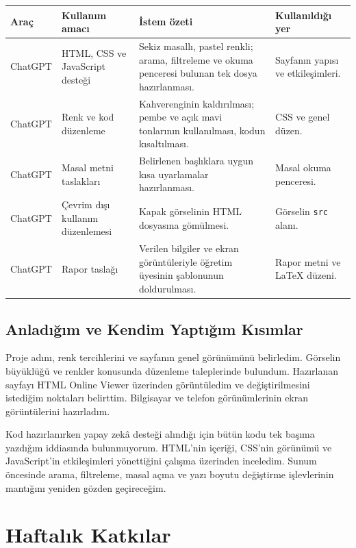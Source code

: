 \documentclass[12pt,a4paper]{article}
\begin{document}
\begin{longtable}{@{}p{1.7cm}p{3.2cm}p{4.6cm}p{3.5cm}@{}}
\toprule
\textbf{Araç} & \textbf{Kullanım amacı}
& \textbf{İstem özeti} & \textbf{Kullanıldığı yer}\\
\midrule
\endhead

ChatGPT
& HTML, CSS ve JavaScript desteği
& Sekiz masallı, pastel renkli; arama, filtreleme
ve okuma penceresi bulunan tek dosya hazırlanması.
& Sayfanın yapısı ve etkileşimleri.\\

ChatGPT
& Renk ve kod düzenleme
& Kahverenginin kaldırılması; pembe ve açık mavi
tonlarının kullanılması, kodun kısaltılması.
& CSS ve genel düzen.\\

ChatGPT
& Masal metni taslakları
& Belirlenen başlıklara uygun kısa uyarlamalar
hazırlanması.
& Masal okuma penceresi.\\

ChatGPT
& Çevrim dışı kullanım düzenlemesi
& Kapak görselinin HTML dosyasına gömülmesi.
& Görselin \texttt{src} alanı.\\

ChatGPT
& Rapor taslağı
& Verilen bilgiler ve ekran görüntüleriyle
öğretim üyesinin şablonunun doldurulması.
& Rapor metni ve LaTeX düzeni.\\

\bottomrule
\end{longtable}

\subsection{Anladığım ve Kendim Yaptığım Kısımlar}

Proje adını, renk tercihlerini ve sayfanın genel
görünümünü belirledim. Görselin büyüklüğü ve
renkler konusunda düzenleme taleplerinde bulundum.
Hazırlanan sayfayı HTML Online Viewer üzerinden
görüntüledim ve değiştirilmesini istediğim
noktaları belirttim. Bilgisayar ve telefon
görünümlerinin ekran görüntülerini hazırladım.

Kod hazırlanırken yapay zekâ desteği alındığı için
bütün kodu tek başıma yazdığım iddiasında bulunmuyorum.
HTML'nin içeriği, CSS'nin görünümü ve JavaScript'in
etkileşimleri yönettiğini çalışma üzerinden
inceledim. Sunum öncesinde arama, filtreleme,
masal açma ve yazı boyutu değiştirme işlevlerinin
mantığını yeniden gözden geçireceğim.

\section{Haftalık Katkılar}
\end{document}
